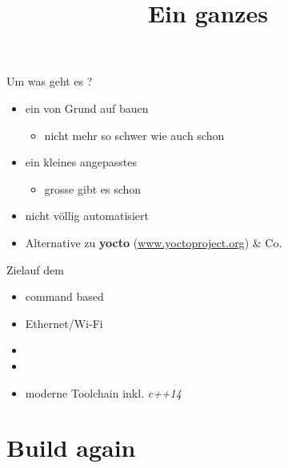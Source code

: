 \documentclass{beamer}
\begin{document}
\title[Build]{Ein ganzes \linux}

\frame{\titlepage}

\begin{frame}{Um was geht es ?}
 \begin{itemize}
  \item ein \linux von Grund auf bauen
  \begin{itemize}
   \item nicht mehr so schwer wie auch schon
  \end{itemize}
  \item ein kleines angepasstes \linux
  \begin{itemize}
   \item grosse \linux gibt es schon
  \end{itemize}
  \item nicht völlig automatisiert
  \item Alternative zu {\bf yocto} (\url{www.yoctoproject.org}) \& Co. 
 \end{itemize}
\end{frame}

\begin{frame}{Ziel}{\linux auf dem \target}
\begin{itemize}
 \item command based
 \item Ethernet/Wi-Fi
 \item {} 
 \item {}
 \item moderne Toolchain inkl. {\em c++14} \cpp
\end{itemize}
\end{frame}









\part{Build again}
\frame{\titlepage}
\frame{\partpage}

\end{document}
